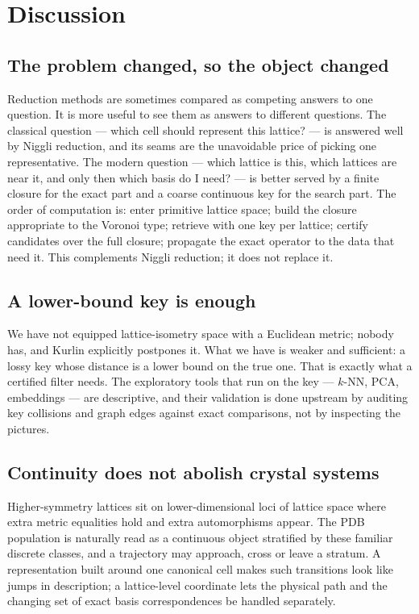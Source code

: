\documentclass[11pt]{article}
\begin{document}
\section{Discussion}

\subsection{The problem changed, so the object changed}

Reduction methods are sometimes compared as competing answers to one question. It is more useful to see them as answers to different questions. The classical question --- which cell should represent this lattice? --- is answered well by Niggli reduction, and its seams are the unavoidable price of picking one representative. The modern question --- which lattice is this, which lattices are near it, and only then which basis do I need? --- is better served by a finite closure for the exact part and a coarse continuous key for the search part. The order of computation is: enter primitive lattice space; build the closure appropriate to the Voronoi type; retrieve with one key per lattice; certify candidates over the full closure; propagate the exact operator to the data that need it. This complements Niggli reduction; it does not replace it.

\subsection{A lower-bound key is enough}

We have not equipped lattice-isometry space with a Euclidean metric; nobody has, and Kurlin explicitly postpones it. What we have is weaker and sufficient: a lossy key whose distance is a lower bound on the true one. That is exactly what a certified filter needs. The exploratory tools that run on the key --- $k$-NN, PCA, embeddings --- are descriptive, and their validation is done upstream by auditing key collisions and graph edges against exact comparisons, not by inspecting the pictures.

\subsection{Continuity does not abolish crystal systems}

Higher-symmetry lattices sit on lower-dimensional loci of lattice space where extra metric equalities hold and extra automorphisms appear. The PDB population is naturally read as a continuous object stratified by these familiar discrete classes, and a trajectory may approach, cross or leave a stratum. A representation built around one canonical cell makes such transitions look like jumps in description; a lattice-level coordinate lets the physical path and the changing set of exact basis correspondences be handled separately.
\end{document}
